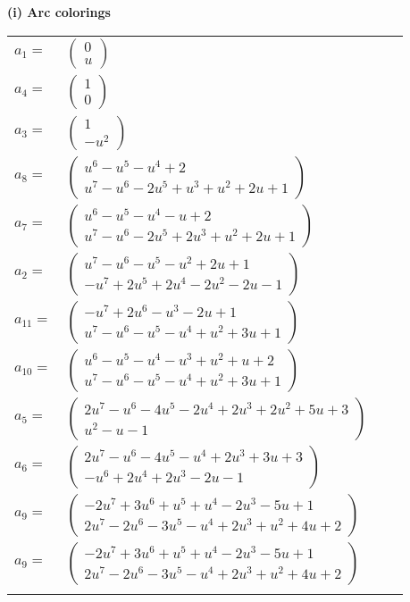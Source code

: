 \documentclass[1p]{elsarticle_modified}
\theoremstyle{definition}
\begin{document}
\flushleft \textbf{(i) Arc colorings}\\
\begin{tabular}{m{7pt} m{180pt} m{7pt} m{180pt} }
\flushright $a_{1}=$&$\begin{pmatrix}0\\u\end{pmatrix}$ \\
\flushright $a_{4}=$&$\begin{pmatrix}1\\0\end{pmatrix}$ \\
\flushright $a_{3}=$&$\begin{pmatrix}1\\- u^2\end{pmatrix}$ \\
\flushright $a_{8}=$&$\begin{pmatrix}u^6- u^5- u^4+2\\u^7- u^6-2 u^5+u^3+u^2+2 u+1\end{pmatrix}$ \\
\flushright $a_{7}=$&$\begin{pmatrix}u^6- u^5- u^4- u+2\\u^7- u^6-2 u^5+2 u^3+u^2+2 u+1\end{pmatrix}$ \\
\flushright $a_{2}=$&$\begin{pmatrix}u^7- u^6- u^5- u^2+2 u+1\\- u^7+2 u^5+2 u^4-2 u^2-2 u-1\end{pmatrix}$ \\
\flushright $a_{11}=$&$\begin{pmatrix}- u^7+2 u^6- u^3-2 u+1\\u^7- u^6- u^5- u^4+u^2+3 u+1\end{pmatrix}$ \\
\flushright $a_{10}=$&$\begin{pmatrix}u^6- u^5- u^4- u^3+u^2+u+2\\u^7- u^6- u^5- u^4+u^2+3 u+1\end{pmatrix}$ \\
\flushright $a_{5}=$&$\begin{pmatrix}2 u^7- u^6-4 u^5-2 u^4+2 u^3+2 u^2+5 u+3\\u^2- u-1\end{pmatrix}$ \\
\flushright $a_{6}=$&$\begin{pmatrix}2 u^7- u^6-4 u^5- u^4+2 u^3+3 u+3\\- u^6+2 u^4+2 u^3-2 u-1\end{pmatrix}$ \\
\flushright $a_{9}=$&$\begin{pmatrix}-2 u^7+3 u^6+u^5+u^4-2 u^3-5 u+1\\2 u^7-2 u^6-3 u^5- u^4+2 u^3+u^2+4 u+2\end{pmatrix}$\\ \flushright $a_{9}=$&$\begin{pmatrix}-2 u^7+3 u^6+u^5+u^4-2 u^3-5 u+1\\2 u^7-2 u^6-3 u^5- u^4+2 u^3+u^2+4 u+2\end{pmatrix}$\\&\end{tabular}
\end{document}
